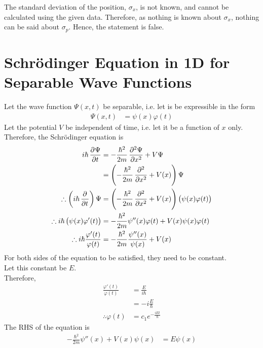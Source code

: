 \documentclass[titlepage, fleqn, a4paper, 12pt, twoside]{article}
\theoremstyle{definition}
\theoremstyle{theorem}
\let\Oldsection\section
\renewcommand{\section}{\FloatBarrier\Oldsection}
\begin{document}
\begin{solution}
	The standard deviation of the position, $\sigma_x$, is not known, and cannot be calculated using the given data.
	Therefore, as nothing is known about $\sigma_x$, nothing can be said about $\sigma_p$.
	Hence, the statement is false.
\end{solution}

\section{Schrödinger Equation in 1D for Separable Wave Functions}

Let the wave function $\Psi(x,t)$ be separable, i.e. let is be expressible in the form
\begin{align*}
	\Psi(x,t) &= \psi(x) \varphi(t)
\end{align*}
Let the potential $V$ be independent of time, i.e. let it be a function of $x$ only.\\
Therefore, the Schrödinger equation is
\begin{align*}
	i \hbar \dpd{\Psi}{t} &= -\frac{\hbar^2}{2 m} \dpd[2]{\Psi}{x} + V \Psi\\
	&= \left( -\frac{\hbar^2}{2 m} \dpd[2]{}{x} + V(x) \right) \Psi\\
	\therefore \left( i \hbar \dpd{}{t} \right) \Psi &= \left( -\frac{\hbar^2}{2 m} \dpd[2]{}{x} + V(x) \right) \left( \psi(x) \varphi(t) \right)\\
	\therefore i \hbar \left( \psi(x) \varphi'(t) \right) &= -\frac{\hbar^2}{2 m} \psi''(x) \varphi(t) + V(x) \psi(x) \varphi(t)\\
	\therefore i \hbar \frac{\varphi'(t)}{\varphi(t)} &= -\frac{\hbar^2}{2 m} \frac{\psi''(x)}{\psi(x)} + V(x)
\end{align*}
For both sides of the equation to be satisfied, they need to be constant.\\
Let this constant be $E$.\\
Therefore,
\begin{align*}
	\frac{\varphi'(t)}{\varphi(t)} &= \frac{E}{i \hbar}\\
	&= -i \frac{E}{\hbar}\\
	\therefore \varphi(t) &= c_1 e^{-\frac{i E t}{\hbar}}
\end{align*}
The RHS of the equation is
\begin{align*}
	-\frac{\hbar^2}{2 m} \psi''(x) + V(x) \psi(x) &= E \psi(x)
\end{align*}
\end{document}
